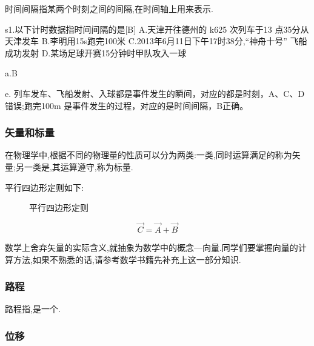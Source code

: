 时间间隔指某两个时刻之间的间隔,在时间轴上用来表示.

\begin{selection}
  s1.以下计时数据指时间间隔的是[B]
  A.天津开往德州的 k625 次列车于13 点35分从天津发车
  B.李明用15s跑完100米
  C.2013年6月11日下午17时38分,``神舟十号'' 飞船成功发射
  D.某场足球开赛15分钟时甲队攻入一球

  a.B

  e. 列车发车、飞船发射、入球都是事件发生的瞬间，对应的都是时刻，A、C、D错误;跑完100m 是事件发生的过程，对应的是时间间隔，B正确。

\end{selection}

\subsubsection{矢量和标量}
在物理学中,根据不同的物理量的性质可以分为两类:一类,同时运算满足的称为矢量;另一类是,其运算遵守,称为标量.

平行四边形定则如下:

\begin{figure}[H]
  \centering
  \caption{平行四边形定则}
  \label{fig:parallelogram law}
\end{figure}

$$\vec{C}=\vec{A}+\vec{B}$$

数学上舍弃矢量的实际含义,就抽象为数学中的概念---向量.同学们要掌握向量的计算方法,如果不熟悉的话,请参考数学书籍先补充上这一部分知识.

\subsubsection{路程}

路程指,是一个.

\subsubsection{位移}

